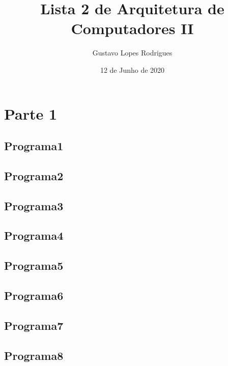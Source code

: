\documentclass{article}
\title{Lista 2 de Arquitetura de Computadores II}
\author{Gustavo Lopes Rodrigues}
\date{12 de Junho de 2020}
\begin{document}
\maketitle

\section{Parte 1}
\subsection{Programa1}

\newpage

\subsection{Programa2}

\newpage

\subsection{Programa3}

\newpage

\subsection{Programa4}

\newpage

\subsection{Programa5}

\newpage

\subsection{Programa6}

\newpage

\subsection{Programa7}

\newpage

\subsection{Programa8}

\newpage
\end{document}
